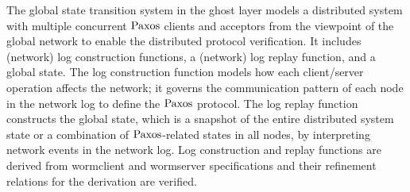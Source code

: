 	The global state transition system in the ghost layer models a distributed system with multiple concurrent $\mathrm{Paxos}$ clients and acceptors from the viewpoint of the global network to enable the distributed protocol verification. It includes (network) log construction functions, a (network) log replay function, and a global state. The log construction function models how each client/server operation affects the network; it governs the communication pattern of each node in the network log to define the $\mathrm{Paxos}$ protocol. The log replay function constructs the global state, which is a snapshot of the entire distributed system state or a combination of $\mathrm{Paxos}$-related states in all nodes, by interpreting network events in the network log. Log construction and replay functions are derived from wormclient and wormserver specifications and their refinement relations for the derivation are verified. 

